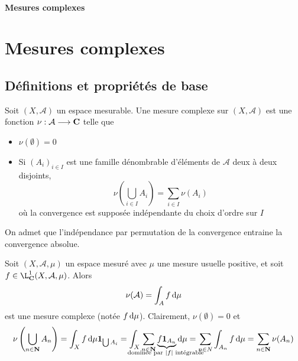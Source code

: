\ifsolo
    ~

    \vspace{1cm}

    \begin{center}
        \textbf{\LARGE Mesures complexes} \\[1em]
    \end{center}
    \tableofcontents
\else
    \chapter{Mesures complexes}

    \minitoc
\fi
\thispagestyle{empty}

\section{Définitions et propriétés de base}

\begin{dfn}
    Soit $(X, \mathcal  A)$ un espace mesurable. Une mesure complexe sur $(X, \mathcal  A)$ est une fonction $\nu: \mathcal  A \longrightarrow  \mathbf C$ telle que \begin{itemize}
        \item $\nu(\emptyset)=0$
        \item Si  $(A_i)_{i \in  I}$ est une famille dénombrable d'éléments de $\mathcal  A$ deux à deux disjoints, \[
                \nu \left( \bigcup_{i \in  I} A_i\right) = \sum_{i \in  I}\nu(A_i)
        \] 
        où la convergence est supposée indépendante du choix d'ordre sur $I$
    \end{itemize}
\end{dfn}

\begin{rem}
On admet que l'indépendance par permutation de la convergence entraine la convergence absolue.
\end{rem}

\begin{ex}
    Soit $(X, \mathcal  A, \mu)$ un espace mesuré avec $\mu$ une mesure usuelle positive, et soit  $f \in  \L^1_{\C}(X, \mathcal  A, \mu)$. Alors \[
        \nu(\mathcal  A)=\int_A f\mathop{}\!\mathrm d \mu
    \] 
    est une mesure complexe (notée $f\mathop{}\!\mathrm d \mu$). Clairement, $\nu(\emptyset)=0$ et  \[
        \nu \left(\bigcup_{n \in  \N}A_n\right)=\int_{X}f\diff \mu \1_{\bigcup A_i}=\int_{X}\sum_{n \in  \N}\underbrace{f\1_{A_n}}_{\mathclap{\text{dominée par }|f|\text{ intégrable }}}\diff \mu = \sum_{n \in  N}\int_{A_n} f\diff \mu=\sum_{n \in  \N}\nu(A_n)
    \] 
\end{ex}

